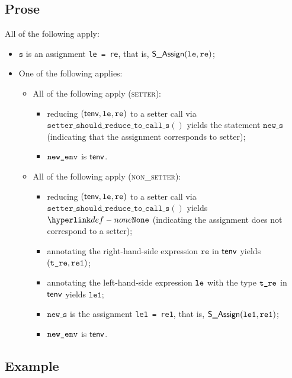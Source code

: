 \documentclass{book}
\newcommand\ProseOrTypeError[0]{\ProseTerminateAs{\TypeErrorConfig}}
\newcommand\inlinesetter[1]{\texttt{setter\_should\_reduce\_to\_call\_s}(#1)}
\newcommand\vleone[0]{\texttt{le1}}
\newcommand\vre[0]{\texttt{re}}
\newcommand\vs[0]{\texttt{s}}
\newcommand\news[0]{\texttt{new\_s}}
\begin{document}
\subsection{Prose}
All of the following apply:
\begin{itemize}
  \item $\vs$ is an assignment \texttt{le = re}, that is, $\SAssign(\vle, \vre)$;
  \item One of the following applies:
  \begin{itemize}
    \item All of the following apply (\textsc{setter}):
    \begin{itemize}
      \item reducing $(\tenv, \vle, \vre)$ to a setter call via \\ $\inlinesetter{}$ yields the statement $\news$
      (indicating that the assignment corresponds to setter)\ProseOrTypeError;
      \item $\texttt{new\_env}$ is $\textsf{tenv}$.
    \end{itemize}

    \item All of the following apply (\textsc{non\_setter}):
    \begin{itemize}
      \item reducing $(\tenv, \vle, \vre)$ to a setter call via \\ $\inlinesetter{}$ yields $\None$
            (indicating the assignment does not correspond to a setter);
      \item annotating the right-hand-side expression $\vre$ in $\textsf{tenv}$ yields $(\texttt{t\_re}, \texttt{re1})$\ProseOrTypeError;
      \item annotating the left-hand-side expression $\texttt{le}$ with the type $\texttt{t\_re}$ in $\textsf{tenv}$ yields $\vleone$\ProseOrTypeError;
      \item $\news$ is the assignment \texttt{le1 = re1}, that is, $\SAssign(\vleone, \vreone)$;
      \item $\texttt{new\_env}$ is $\textsf{tenv}$.
    \end{itemize}

  \end{itemize}
\end{itemize}

\subsection{Example}

\end{document}
